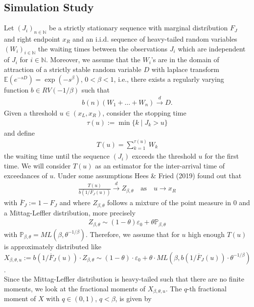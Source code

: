 \documentclass[10pt, a4paper]{article}\usepackage[]{graphicx}\usepackage[]{color}
\newcommand{\widebar}{\overline}
\begin{document}
	
	
	
\subsection*{Simulation Study}
Let $(J_i)_{n \in \mathbb{N}}$ be a strictly stationary sequence with marginal distribution $F_J$ and right endpoint $x_R$ and an i.i.d. sequence of heavy-tailed random variables $(W_i)_{i \in \mathbb{N}}$ the waiting times between the observations $J_i$ which are independent of $J_i$ for $i \in \mathbb{N}$. Moreover, we assume that the $W_i$'s are in the domain of attraction of a strictly stable random variable $D$ with laplace transform $\mathbb{E}(e^{-sD})=\exp(-s^{\beta})$, $0<\beta<1$, i.e., there exists a regularly varying function $b \in RV(-1/\beta)$ such that
\begin{align} \label{eq4}
b(n)(W_1+\dots+W_n) \overset{d}{\longrightarrow} D.
\end{align}
Given a threshold $u \in (x_L,x_R)$, consider the stopping time 
\begin{align}
	\tau(u):=\min\{k \mid J_k > u \}
\end{align}
and define 
\begin{align}
	T(u)=\sum_{k=1}^{\tau(u)} W_k
\end{align}
the waiting time until the sequence $(J_i)$ exceeds the threshold $u$ for the first time. We will consider $T(u)$ as an estimator for the inter-arrival time of exceedances of $u$.
Under some assumptions Hees \& Fried (2019) found out that 
\begin{align}
	\frac{T(u)}{b(1/\overline{F}_J(u))} \overset{d}{\longrightarrow} Z_{\beta,\theta} \quad \text{as} \quad u \to x_R
\end{align}
with $\widebar{F}_J:=1-F_J$ and where $Z_{\beta,\theta}$ follows a mixture of the point measure in 0 and a Mittag-Leffler distribution, more precisely
\begin{align}
	Z_{\beta,\theta} \sim (1-\theta)\varepsilon_0+\theta\mathbb{P}_{\beta,\theta}
\end{align}
with $\mathbb{P}_{\beta,\theta}=ML(\beta,\theta^{-1/\beta})$.
Therefore, we assume that for $u$ high enough $T(u)$ is approximately distributed like $X_{\beta,\theta,u}:=b(1/\widebar{F}_J(u)) \cdot Z_{\beta,\theta} \sim (1-\theta)\cdot\varepsilon_0+\theta \cdot ML(\beta,b(1/\widebar{F}_J(u)) \cdot \theta^{-1/\beta})$.
\\
Since the Mittag-Leffler distribution is heavy-tailed such that there are no finite moments, we look at the fractional moments of $X_{\beta,\theta,u}$. The $q$-th fractional moment of $X$ with $q \in (0,1)$, $q<\beta$, is given by
\end{document}
